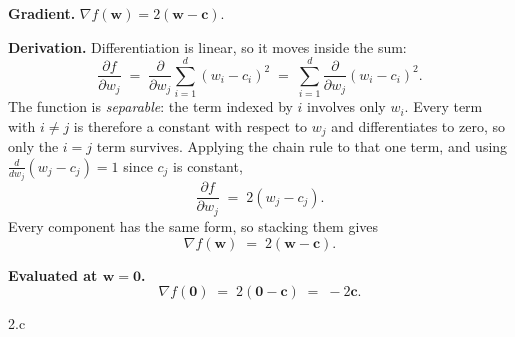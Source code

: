 \begin{answer}
  \textbf{Gradient.} $\nabla f(\mathbf w) = 2(\mathbf w - \mathbf c)$.

  \medskip
  \textbf{Derivation.} Differentiation is linear, so it moves inside the sum:
  \[
    \frac{\partial f}{\partial w_j}
      \;=\; \frac{\partial}{\partial w_j}\sum_{i=1}^{d}(w_i-c_i)^2
      \;=\; \sum_{i=1}^{d}\frac{\partial}{\partial w_j}(w_i-c_i)^2 .
  \]
  The function is \emph{separable}: the term indexed by $i$ involves only $w_i$. Every term with
  $i \neq j$ is therefore a constant with respect to $w_j$ and differentiates to zero, so only the
  $i = j$ term survives. Applying the chain rule to that one term, and using
  $\frac{d}{dw_j}(w_j-c_j) = 1$ since $c_j$ is constant,
  \[
    \frac{\partial f}{\partial w_j} \;=\; 2(w_j-c_j).
  \]
  Every component has the same form, so stacking them gives
  \[
    \nabla f(\mathbf w) \;=\; 2(\mathbf w - \mathbf c).
  \]

  \medskip
  \textbf{Evaluated at $\mathbf w = \mathbf 0$.}
  \[
    \nabla f(\mathbf 0) \;=\; 2(\mathbf 0 - \mathbf c) \;=\; -2\mathbf c .
  \]
\end{answer}

\LARGE
2.c
\normalsize

